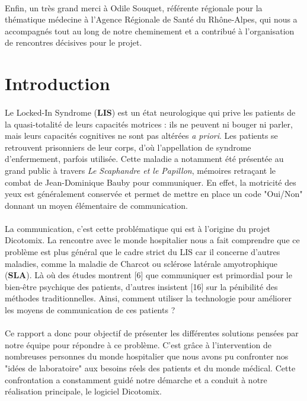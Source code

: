 \documentclass[11pt,a4paper]{article}
\theoremstyle{plain}
\theoremstyle{definition}
\begin{document}
\paragraph{}Enfin, un très grand merci à Odile Souquet, référente régionale pour la thématique médecine à l'Agence Régionale de Santé du Rhône-Alpes, qui nous a accompagnés tout au long de notre cheminement et a contribué à l'organisation de rencontres décisives pour le projet.

\newpage

\tableofcontents

\newpage
\section{Introduction}

\paragraph{} Le Locked-In Syndrome (\textbf{LIS}) est un état neurologique qui prive les patients de la quasi-totalité de leurs capacités motrices : ils ne peuvent ni bouger ni parler,
mais leurs capacités cognitives ne sont pas altérées \textit{a priori}. Les patients se retrouvent prisonniers de leur corps, d'où l'appellation de syndrome d'enfermement, parfois utilisée.
Cette maladie a notamment été présentée au grand public à travers \textit{Le Scaphandre et le Papillon}, mémoires retraçant le combat de Jean-Dominique Bauby pour communiquer. 
En effet, la motricité des yeux est généralement conservée et permet de mettre en place un code "Oui/Non" donnant un moyen élémentaire de communication.

\paragraph{} La communication, c'est cette problématique qui est à l'origine du projet Dicotomix. La rencontre avec le monde hospitalier nous a fait comprendre que ce problème est plus général 
que le cadre strict du LIS car il concerne d'autres maladies, comme la maladie de Charcot ou sclérose latérale amyotrophique (\textbf{SLA}). Là où des études montrent [6] que communiquer est primordial pour le bien-être psychique des patients, d'autres insistent [16] sur la pénibilité des méthodes traditionnelles. Ainsi, comment utiliser la technologie pour améliorer les moyens de communication de ces patients ? 

\paragraph{} Ce rapport a donc pour objectif de présenter les différentes solutions pensées par notre équipe pour répondre à ce problème. C'est grâce à l'intervention de nombreuses personnes du monde hospitalier que 
nous avons pu confronter nos "idées de laboratoire" aux besoins réels des patients et du monde médical. Cette confrontation a constamment guidé notre démarche et a conduit à notre réalisation principale, le logiciel Dicotomix.
\end{document}
